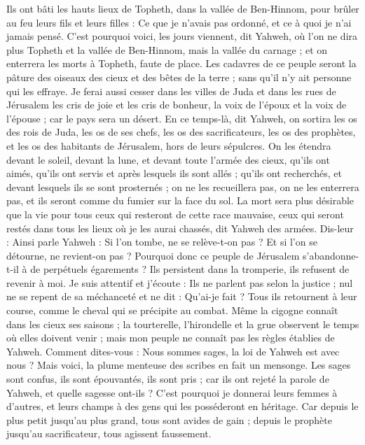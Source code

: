 \begin{multicols}{2}
Ils ont bâti les hauts lieux de Topheth, dans la vallée de Ben-Hinnom, pour brûler au feu leurs fils et leurs filles : Ce que je n'avais pas ordonné, et ce à quoi je n'ai jamais pensé.
C'est pourquoi voici, les jours viennent, dit Yahweh, où l'on ne dira plus Topheth et la vallée de Ben-Hinnom, mais la vallée du carnage ; et on enterrera les morts à Topheth, faute de place.
Les cadavres de ce peuple seront la pâture des oiseaux des cieux et des bêtes de la terre ; sans qu'il n'y ait personne qui les effraye.
Je ferai aussi cesser dans les villes de Juda et dans les rues de Jérusalem les cris de joie et les cris de bonheur, la voix de l'époux et la voix de l'épouse ; car le pays sera un désert.
\VerseOne{}En ce temps-là, dit Yahweh, on sortira les os des rois de Juda, les os de ses chefs, les os des sacrificateurs, les os des prophètes, et les os des habitants de Jérusalem, hors de leurs sépulcres.
On les étendra devant le soleil, devant la lune, et devant toute l'armée des cieux, qu'ils ont aimés, qu'ils ont servis et après lesquels ils sont allés ; qu'ils ont recherchés, et devant lesquels ils se sont prosternés ; on ne les recueillera pas, on ne les enterrera pas, et ils seront comme du fumier sur la face du sol.
La mort sera plus désirable que la vie pour tous ceux qui resteront de cette race mauvaise, ceux qui seront restés dans tous les lieux où je les aurai chassés, dit Yahweh des armées.
Dis-leur : Ainsi parle Yahweh : Si l'on tombe, ne se relève-t-on pas ? Et si l'on se détourne, ne revient-on pas ?
Pourquoi donc ce peuple de Jérusalem s'abandonne-t-il à de perpétuels égarements ? Ils persistent dans la tromperie, ils refusent de revenir à moi.
Je suis attentif et j'écoute : Ils ne parlent pas selon la justice ; nul ne se repent de sa méchanceté et ne dit : Qu'ai-je fait ? Tous ils retournent à leur course, comme le cheval qui se précipite au combat.
Même la cigogne connaît dans les cieux ses saisons ; la tourterelle, l'hirondelle et la grue observent le temps où elles doivent venir ; mais mon peuple ne connaît pas les règles établies de Yahweh.
Comment dites-vous : Nous sommes sages, la loi de Yahweh est avec nous ? Mais voici, la plume menteuse des scribes en fait un mensonge.
Les sages sont confus, ils sont épouvantés, ils sont pris ; car ils ont rejeté la parole de Yahweh, et quelle sagesse ont-ils ?
C'est pourquoi je donnerai leurs femmes à d'autres, et leurs champs à des gens qui les posséderont en héritage. Car depuis le plus petit jusqu'au plus grand, tous sont avides de gain ; depuis le prophète jusqu'au sacrificateur, tous agissent faussement.

\end{multicols}
